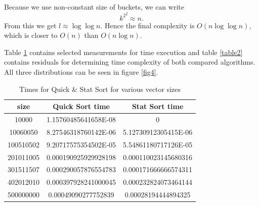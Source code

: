 \documentclass[12pt]{article}
\begin{document}
        Because we use non-constant size of buckets, we can write
        \[
        {k^2}^l \approx n.
        \]
        From this we get $l \approx \log \log n$. Hence the final complexity is $O(n \log \log n)$, which is closer to $O(n)$ than $O(n \log n)$.
			
		Table \ref{table1} contains selected measurements for time execution and table \ref{table2} contains residuals for determining time complexity of both compared algorithms. All three distributions can be seen in figure \ref{fig4}.
		
		\begin{table}
		\caption{Times for Quick \& Stat Sort for various vector sizes}
		\begin{center}
		\begin{tabular}{ |c|c|c| }
		
		\hline
		
		size & Quick Sort time & Stat Sort time \\

		\hline\hline		
		
		10000		& 1.15760485641658E-08	& 0 \\
		10060050    & 8.27546318760142E-06	& 5.12730912305415E-06 \\
		100510502	& 9.20717575354502E-05	& 5.54861180717126E-05 \\
		201011005	& 0.000190925929928198	& 0.000110023145680316 \\
		301511507	& 0.000290057876554783	& 0.000171666666574311 \\
		402012010	& 0.000397928241000045	& 0.000232824073464144 \\
		500000000	& 0.00049090277752839	& 0.00028194444894325 \\

		\hline
		\end{tabular}
		\end{center}
		\label{table1}
		\end{table}
\end{document}
